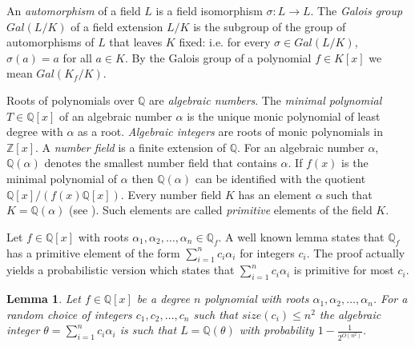 \documentclass{article}
\newtheorem{theorem}{Theorem}[section]
\newtheorem{lemma}[theorem]{Lemma}
\newcommand{\Gal}[1]{\ensuremath{Gal\left(#1\right)}}
\newcommand{\Q}[0]{\ensuremath{\mathbb{Q}}}
\newcommand{\Z}[0]{\ensuremath{\mathbb{Z}}}
\begin{document}
An \emph{automorphism} of a field $L$ is a field isomorphism
$\sigma:L\rightarrow L$. The \emph{Galois group} $\Gal{L/K}$ of a field
extension $L/K$ is the subgroup of the group of automorphisms of $L$
that leaves $K$ fixed: i.e. for every $\sigma\in\Gal{L/K}$, $\sigma(a)
= a$ for all $a \in K$. By the Galois group of a polynomial $f\in
K[x]$ we mean $\Gal{K_f/K}$.

%


Roots of polynomials over $\Q$ are \emph{algebraic numbers}. The
\emph{minimal polynomial} $T\in\Q[x]$ of an algebraic number $\alpha$
is the unique monic polynomial of least degree with $\alpha$ as a
root. \emph{Algebraic integers} are roots of monic polynomials in
$\Z[x]$. A \emph{number field} is a finite extension of $\Q$. For an
algebraic number $\alpha$, $\Q(\alpha)$ denotes the smallest number
field that contains $\alpha$. If $f(x)$ is the minimal polynomial of
$\alpha$ then $\Q(\alpha)$ can be identified with the quotient
$\Q[x]/(f(x)\Q[x])$. Every number field $K$ has an element $\alpha$
such that $K = \Q(\alpha)$ (see \cite[Theorem 4.6
Chap.V]{lang:algebra}). Such elements are called \emph{primitive}
elements of the field $K$.

Let $f\in\Q[x]$ with roots $\alpha_1,\alpha_2,\ldots,\alpha_n\in
\Q_f$. A well known lemma \cite{waerden:1991} states that $\Q_f$ has a
primitive element of the form $\sum_{i=1}^n c_i \alpha_i$ for integers
$c_i$. The proof actually yields a probabilistic version which states
that $\sum_{i=1}^n c_i \alpha_i$ is primitive for most $c_i$.

\begin{lemma}\label{random:prim:element}
  Let $f\in \Q[x]$ be a degree $n$ polynomial with roots
  $\alpha_1,\alpha_2,\ldots,\alpha_n$. For a random choice of integers
  $c_1,c_2,\ldots,c_n$ such that $size(c_i) \leq n^2$ the algebraic
  integer $\theta = \sum_{i=1}^n c_i \alpha_i$ is such that $L =
  \Q(\theta)$ with probability $1- \frac{1}{2^{O(n^2)}}$.
\end{lemma}
\end{document}
